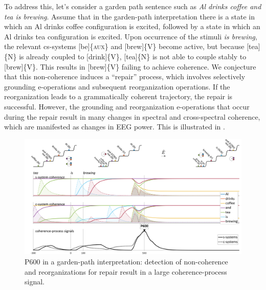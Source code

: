   To address this, let's consider a garden path sentence such as \textit{Al drinks coffee and tea is brewing}. Assume that in the garden-path interpretation there is a state in which an {\textbar}Al drinks coffee{\textbar} configuration is excited, followed by a state in which an {\textbar}Al drinks tea{\textbar} configuration is excited. Upon occurrence of the stimuli \textit{is brewing}, the relevant cs-systems [be]\{\textsc{aux}\} and [brew]\{V\} become active, but because [tea]\{N\} is already coupled to [drink]\{V\}, [tea]\{N\} is not able to couple stably to [brew]\{V\}. This results in [brew]\{V\} failing to achieve coherence. We conjecture that this non-coherence induces a “repair” process, which involves selectively grounding e-operations and subsequent reorganization operations. If the reorganization leads to a grammatically coherent trajectory, the repair is successful. However, the grounding and reorganization e-operations that occur during the repair result in many changes in spectral and cross-spectral coherence, which are manifested as changes in EEG power. This is illustrated in {}.

  
\begin{figure}
\includegraphics[width=\textwidth]{figures/Tilsen-img144.png}
\caption{P600 in a garden-path interpretation: detection of non-coherence and reorganizations for repair result in a large coherence-process signal.}
\label{fig:6:25}
\end{figure}
 

